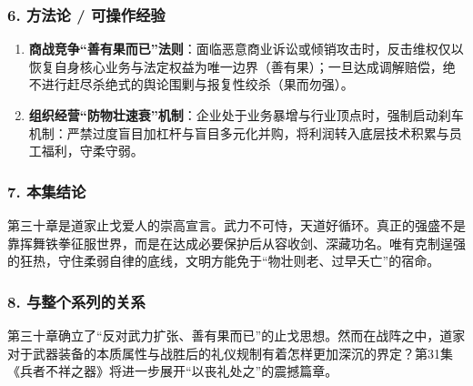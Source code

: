 \subsubsection{6. 方法论 / 可操作经验}
\begin{enumerate}
    \item \textbf{商战竞争“善有果而已”法则}：面临恶意商业诉讼或倾销攻击时，反击维权仅以恢复自身核心业务与法定权益为唯一边界（善有果）；一旦达成调解赔偿，绝不进行赶尽杀绝式的舆论围剿与报复性绞杀（果而勿强）。
    \item \textbf{组织经营“防物壮速衰”机制}：企业处于业务暴增与行业顶点时，强制启动刹车机制：严禁过度盲目加杠杆与盲目多元化并购，将利润转入底层技术积累与员工福利，守柔守弱。
\end{enumerate}

\subsubsection{7. 本集结论}
第三十章是道家止戈爱人的崇高宣言。武力不可恃，天道好循环。真正的强盛不是靠挥舞铁拳征服世界，而是在达成必要保护后从容收剑、深藏功名。唯有克制逞强的狂热，守住柔弱自律的底线，文明方能免于“物壮则老、过早夭亡”的宿命。

\subsubsection{8. 与整个系列的关系}
第三十章确立了“反对武力扩张、善有果而已”的止戈思想。然而在战阵之中，道家对于武器装备的本质属性与战胜后的礼仪规制有着怎样更加深沉的界定？第31集《兵者不祥之器》将进一步展开“以丧礼处之”的震撼篇章。